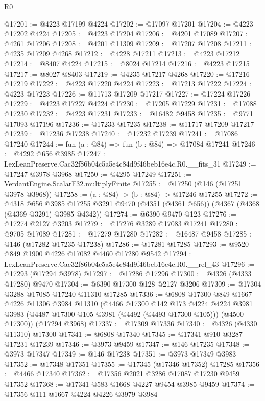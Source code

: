 \begin{lexlean}{R0}
\begin{coremodule}
@17201 := @4223 @17199 @4224
@17202 := @17097 @17201
@17204 := @4223 @17202 @4224
@17205 := @4223 @17204
@17206 := @4201 @17089
@17207 := @4261 @17206
@17208 := @4201 @11309
@17209 := @17207 @17208
@17211 := @4235 @17209 @4268
@17212 := @4228 @17211
@17213 := @4223 @17212
@17214 := @8407 @4224
@17215 := @8024 @17214
@17216 := @4223 @17215
@17217 := @8027 @8403
@17219 := @4235 @17217 @4268
@17220 := @17216 @17219
@17222 := @4223 @17220 @4224
@17223 := @17213 @17222
@17224 := @4223 @17223
@17226 := @11713 @17209 @17217
@17227 := @17224 @17226
@17229 := @4223 @17227 @4224
@17230 := @17205 @17229
@17231 := @17088 @17230
@17232 := @4223 @17231
@17233 := @16482 @9458
@17235 := @9771 @17093 @17196
@17236 := @17233 @17235
@17238 := @11717 @17209 @17217
@17239 := @17236 @17238
@17240 := @17232 @17239
@17241 := @17086 @17240
@17244 := fun (a : @84) => fun (b : @84) => @17084 @17241
@17246 := @4292 @656 @3985
@17247 := LexLeanPreserve.Cac32f86b04c5a5e4c84d9f46beb16e4c.R0.__fits_31
@17249 := @17247 @3978 @3968
@17250 := @4295 @17249
@17251 := VerdantEngine.ScalarF32.multiplyFinite
@17255 := @17250 (@146 (@17251 @3978 @3968))
@17258 := (a : @84) -> (b : @84) -> @17246 @17255
@17272 := @4318
    @656
    @3985
    @17255
    @3291
    @9470
    (@4351 (@4361 @656))
    (@4367 (@4368 (@4369 @3291) @3985 @4342))
@17274 := @6390 @9470 @123
@17276 := @17274 @2127 @3203
@17279 := @17276 @3289 @17083 @17241
@17280 := @9705 @17089
@17281 := @17279 @17280
@17282 := @16487 @9458
@17285 := @146 (@17282 @17235 @17238)
@17286 := @17281 @17285
@17293 := @9520 @849 @1900 @4226 @17082 @4460 @17280 @9542
@17294 := LexLeanPreserve.Cac32f86b04c5a5e4c84d9f46beb16e4c.R0.__rel_43
@17296 := @17293 (@17294 @3978)
@17297 := @17286 @17296
@17300 := @4326 (@4333 @17280) @9470
@17304 := @6390 @17300 @128 @2127 @3206
@17309 := @17304 @3288 @17085 @17240 @11310 @17285
@17336 := @6808
    @17300
    @849
    @1667
    @4226
    @11306
    @3984
    @11310
    (@4466
      @17300
      @142
      @173
      @4224
      @4224
      @3981
      @3983
      (@4487 @17300 @105 @3981 (@4492 (@4493 @17300 @105)))
      (@4500 @17300))
    (@17294 @3968)
@17337 := @17309 @17336
@17340 := @4326 (@4330 @11310) @17300
@17341 := @6808 @17340
@17345 := @17341 @910 @3287 @17231 @17239
@17346 := @3973 @9459
@17347 := @146 @17235
@17348 := @3973 @17347
@17349 := @146 @17238
@17351 := @3973 @17349 @3983
@17352 := @17348 @17351
@17355 := @17345 (@17346 @17352) @17285
@17356 := @4466 @17340
@17362 := @17356 @2021 @3286 @17087 @17230 @9459 @17352
@17368 := @17341 @583 @1668 @4227 @9454 @3985 @9459
@17374 := @17356 @111 @1667 @4224 @4226 @3979 @3984

\end{coremodule}
\end{lexlean}

